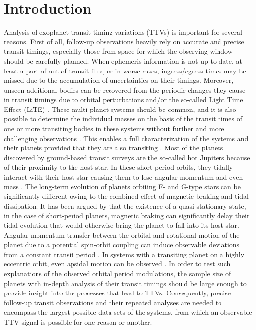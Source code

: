 \documentclass[a4paper,fleqn,usenatbib]{mnras}
\begin{document}
\section{Introduction}
\label{sec:introduction}
Analysis of exoplanet transit timing variations (TTVs) is important for several reasons. First of all, follow-up observations heavily rely on accurate and precise transit timings, especially those from space for which the observing window should be carefully planned. When ephemeris information is not up-to-date, at least a part of out-of-transit flux, or in worse cases, ingress/egress times may be missed due to the accumulation of uncertainties on their timings. Moreover, unseen additional bodies can be recovered from the periodic changes they cause in transit timings due to orbital perturbations and/or the so-called Light Time Effect (LiTE) \citep{2011ApJ...743..200B, 2012ApJ...750..113F, 2018haex.bookE...7A}. These multi-planet systems should be common, and it is also possible to determine the individual masses on the basis of the transit times of one or more transiting bodies in these systems without further and more challenging observations \citep{2018A&A...613A..68G}. This enables a full characterization of the systems and their planets provided that they are also transiting \citep{2021PSJ.....2....1A}. Most of the planets discovered by ground-based transit surveys are the so-called hot Jupiters because of their proximity to the host star. In these short-period orbits, they tidally interact with their host star causing them to lose angular momentum and even mass \citep{2018Sci...362.1388N, 2020AJ....159..278V}. The long-term evolution of planets orbiting F- and G-type stars can be significantly different owing to the combined effect of magnetic braking and tidal dissipation. It has been argued by \citet{2015A&A...574A..39D} that the existence of a quasi-stationary state, in the case of short-period planets, magnetic braking can significantly delay their tidal evolution that would otherwise bring the planet to fall into its host star. Angular momentum transfer between the orbital and rotational motion of the planet due to a potential spin-orbit coupling can induce observable deviations from a constant transit period \citep{2020MNRAS.497.3911L}.  In systems with a transiting planet on a highly eccentric orbit, even apsidal motion can be observed \citep{2017AJ....154....4P, 2019AJ....157..217B, 2019MNRAS.490.4230S, 2020ApJ...893L..29B}. In order to test such explanations of the observed orbital period modulations, the sample size of planets with in-depth analysis of their transit timings should be large enough to provide insight into the processes that lead to TTVs. Consequently, precise follow-up transit observations and their repeated analyses are needed to encompass the largest possible data sets of the systems, from which an observable TTV signal is possible for one reason or another.
\end{document}
